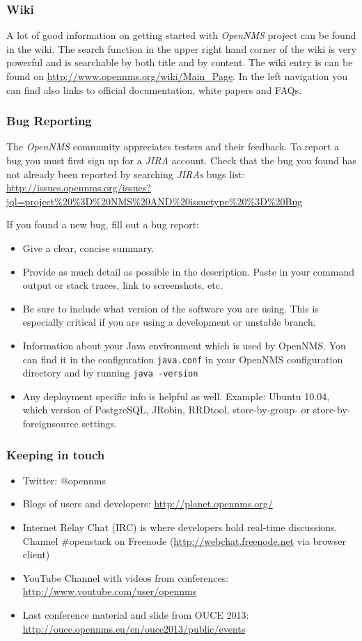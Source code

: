 \subsubsection{Wiki}
A lot of good information on getting started with \emph{OpenNMS} project can be found in the wiki. The search function in the upper right hand corner of the wiki is very powerful and is searchable by both title and by content. The wiki entry is can be found on \url{http://www.opennms.org/wiki/Main_Page}. In the left navigation you can find also links to official documentation, white papers and FAQs.

\subsubsection{Bug Reporting}
The \emph{OpenNMS} community appreciates testers and their feedback. To report a bug you must first sign up for a \emph{JIRA} account.
Check that the bug you found has not already been reported by searching \emph{JIRAs} bugs list: \url{http://issues.opennms.org/issues?jql=project%20%3D%20NMS%20AND%20issuetype%20%3D%20Bug}

If you found a new bug, fill out a bug report:
\begin{itemize}
  \item Give a clear, concise summary.
  \item Provide as much detail as possible in the description. Paste in your command output or stack traces, link to screenshots, etc.
  \item Be sure to include what version of the software you are using. This is especially critical if you are using a development or unstable branch.
  \item Information about your Java environment which is used by OpenNMS. You can find it in the configuration \texttt{java.conf} in your OpenNMS configuration directory and by running \texttt{java -version} 
  \item Any deployment specific info is helpful as well. Example: Ubuntu 10.04, which version of PostgreSQL, JRobin, RRDtool, store-by-group- or store-by-foreignsource settings.
\end{itemize}

\subsubsection{Keeping in touch}
\begin{itemize}
  \item Twitter: @opennms
  \item Blogs of users and developers: \url{http://planet.opennms.org/}
  \item Internet Relay Chat (IRC) is where developers hold real-time discussions. Channel \#openstack on Freenode (\url{http://webchat.freenode.net} via browser client)
  \item YouTube Channel with videos from conferences: \url{http://www.youtube.com/user/opennms}
  \item Last conference material and slide from OUCE 2013: \url{http://ouce.opennms.eu/en/ouce2013/public/events}
\end{itemize}

